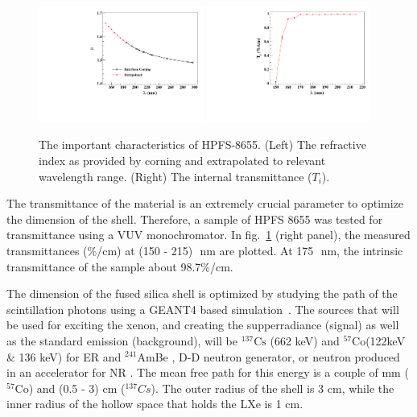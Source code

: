 \begin{figure}[h]
   \centering
   \includegraphics[width=0.48\textwidth]{RI-calibration.pdf}
    \includegraphics[width=0.48\textwidth]{IntTransmittance.pdf}
   \caption{The important characteristics of HPFS-8655. (Left) The refractive index as provided by corning and 
   extrapolated to relevant wavelength range. (Right) The internal transmittance ($T_{i}$).} 
   \label{fig:hpfsRIcalibration}
\end{figure}

The transmittance of the material is an extremely crucial parameter to optimize the 
dimension of the shell. Therefore, a sample of HPFS 8655 was tested for transmittance 
using a VUV monochromator. 
In fig.~\ref{fig:hpfsRIcalibration} (right panel), the measured 
transmittances (\%/cm) at (150 - 215)~\,nm are plotted. At 175~\,nm, the intrinsic transmittance 
of the sample about 98.7\%/cm.  


The dimension of the fused silica shell is optimized by studying the path of the 
scintillation photons using a GEANT4 based simulation~\cite{Agostinelli:2002hh}. 
The sources that will be used for exciting the xenon, and creating the supperradiance 
(signal) as well as the standard emission (background), will be $^{137} \mathrm{Cs}$ 
(662 keV) and $^{57} \mathrm{Co}$(122keV \& 136 keV) for ER and $^{241}$AmBe , 
D-D neutron generator, or neutron produced in an accelerator for NR . The mean 
free path for this energy is a couple of mm ($^{57} \mathrm{Co}$) and (0.5 - 3) 
cm ($^{137} Cs$).  The outer radius of the shell is 3 cm, while the inner radius of the 
hollow space that holds the LXe is 1 cm. 


